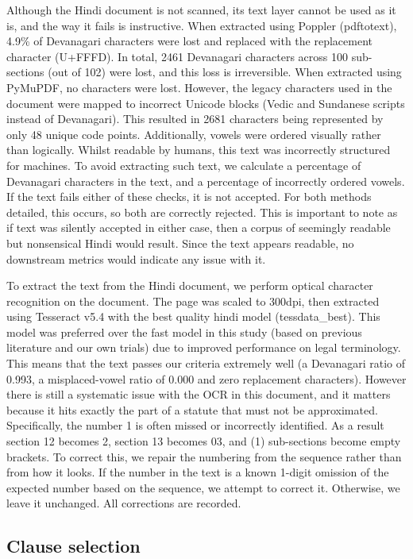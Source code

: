 \documentclass[conference]{IEEEtran}
\begin{document}
Although the Hindi document is not scanned, its text layer cannot be used as it is, and the way it fails is instructive. When extracted using Poppler (pdftotext), 4.9\% of Devanagari characters were lost and replaced with the replacement character (U+FFFD). In total, 2461 Devanagari characters across 100 sub-sections (out of 102) were lost, and this loss is irreversible. When extracted using PyMuPDF, no characters were lost. However, the legacy characters used in the document were mapped to incorrect Unicode blocks (Vedic and Sundanese scripts instead of Devanagari). This resulted in 2681 characters being represented by only 48 unique code points. Additionally, vowels were ordered visually rather than logically. Whilst readable by humans, this text was incorrectly structured for machines. To avoid extracting such text, we calculate a percentage of Devanagari characters in the text, and a percentage of incorrectly ordered vowels. If the text fails either of these checks, it is not accepted. For both methods detailed, this occurs, so both are correctly rejected. This is important to note as if text was silently accepted in either case, then a corpus of seemingly readable but nonsensical Hindi would result. Since the text appears readable, no downstream metrics would indicate any issue with it.

To extract the text from the Hindi document, we perform optical character recognition on the document. The page was scaled to 300dpi, then extracted using Tesseract v5.4 with the best quality hindi model (tessdata\_best). This model was preferred over the fast model in this study (based on previous literature and our own trials) due to improved performance on legal terminology. This means that the text passes our criteria extremely well (a Devanagari ratio of 0.993, a misplaced-vowel ratio of 0.000 and zero replacement characters). However there is still a systematic issue with the OCR in this document, and it matters because it hits exactly the part of a statute that must not be approximated. Specifically, the number 1 is often missed or incorrectly identified. As a result section 12 becomes 2, section 13 becomes 03, and (1) sub-sections become empty brackets. To correct this, we repair the numbering from the sequence rather than from how it looks. If the number in the text is a known 1-digit omission of the expected number based on the sequence, we attempt to correct it. Otherwise, we leave it unchanged. All corrections are recorded.

\subsection{Clause selection}
\end{document}
